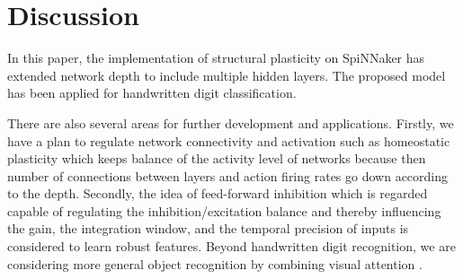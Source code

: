 \documentclass[letterpaper, 10 pt, conference]{ieeeconf}  %
\begin{document}
\section{Discussion}
% 
In this paper, the implementation of structural plasticity on SpiNNaker has extended network depth to include multiple hidden layers. The proposed model has been applied for handwritten digit classification. 

There are also several areas for further development and applications.
Firstly, we have a plan to regulate network connectivity and activation  such as homeostatic plasticity \cite{Tien2018} which keeps balance of the activity level of networks because then number of connections between layers and action firing rates go down according to the depth. 
Secondly, the idea of feed-forward inhibition which is regarded capable of regulating the inhibition/excitation balance and thereby influencing the gain, the integration window, and the temporal precision of inputs \cite{DSouza2016} is considered to learn robust features.
Beyond handwritten digit recognition, we are considering more general object recognition by combining visual attention \cite{Rea2013}.

%
%





\end{document}
